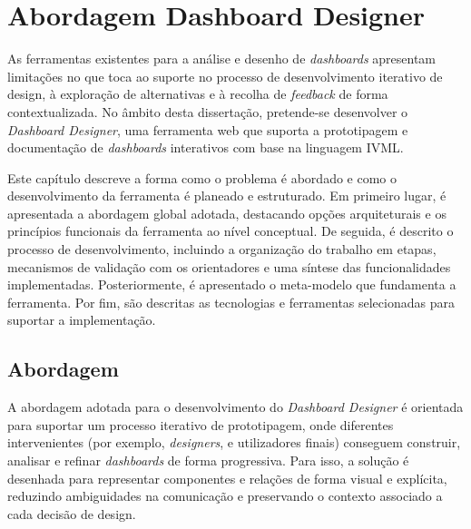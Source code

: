 
%

\chapter{Abordagem Dashboard Designer}
\label{cha:dashboard_designer_abordagem}

As ferramentas existentes para a análise e desenho de \textit{dashboards} apresentam limitações no que toca ao suporte no processo de desenvolvimento iterativo de design, à exploração de alternativas e à recolha de \textit{feedback} de forma contextualizada. No âmbito desta dissertação, pretende-se desenvolver o \textit{Dashboard Designer}, uma ferramenta web que suporta a prototipagem e documentação de \textit{dashboards} interativos com base na linguagem \gls{IVML}.

Este capítulo descreve a forma como o problema é abordado e como o desenvolvimento da ferramenta é planeado e estruturado. Em primeiro lugar, é apresentada a abordagem global adotada, destacando opções arquiteturais e os princípios funcionais da ferramenta ao nível conceptual. De seguida, é descrito o processo de desenvolvimento, incluindo a organização do trabalho em etapas, mecanismos de validação com os orientadores e uma síntese das funcionalidades implementadas. Posteriormente, é apresentado o meta-modelo que fundamenta a ferramenta. Por fim, são descritas as tecnologias e ferramentas selecionadas para suportar a implementação.

\section{Abordagem}
\label{sec:cap3_abordagem}

A abordagem adotada para o desenvolvimento do \textit{Dashboard Designer} é orientada para suportar um processo iterativo de prototipagem, onde diferentes intervenientes (por exemplo, \textit{designers}, e utilizadores finais) conseguem construir, analisar e refinar \textit{dashboards} de forma progressiva. Para isso, a solução é desenhada para representar componentes e relações de forma visual e explícita, reduzindo ambiguidades na comunicação e preservando o contexto associado a cada decisão de design.

